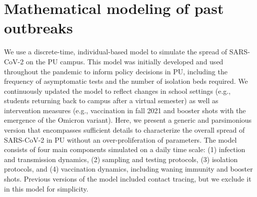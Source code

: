 \documentclass[12pt]{article}
\newcommand{\fref}[1]{Fig.~\ref{fig:#1}}
\providecommand{\DIFdelbegin}{} %
\providecommand{\DIFdelend}{} %
\newcommand{\DIFscaledelfig}{0.5}
\newlength{\DIFdelgraphicswidth} %
\newlength{\DIFdelgraphicsheight} %
\newcommand{\DIFdelincludegraphics}[2][]{%
\sbox{\DIFdelgraphicsbox}{\DIFOincludegraphics[#1]{#2}}%
\settoboxwidth{\DIFdelgraphicswidth}{\DIFdelgraphicsbox} %
\settoboxtotalheight{\DIFdelgraphicsheight}{\DIFdelgraphicsbox} %
\scalebox{\DIFscaledelfig}{%
\parbox[b]{\DIFdelgraphicswidth}{\usebox{\DIFdelgraphicsbox}\\[-\baselineskip] \rule{\DIFdelgraphicswidth}{0em}}\llap{\resizebox{\DIFdelgraphicswidth}{\DIFdelgraphicsheight}{%
\setlength{\unitlength}{\DIFdelgraphicswidth}%
\begin{picture}(1,1)%
\thicklines\linethickness{2pt} %
{\color[rgb]{1,0,0}\put(0,0){\framebox(1,1){}}}%
{\color[rgb]{1,0,0}\put(0,0){\line( 1,1){1}}}%
{\color[rgb]{1,0,0}\put(0,1){\line(1,-1){1}}}%
\end{picture}%
}\hspace*{3pt}}} %
} %
\DeclareRobustCommand{\DIFdelbegin}{\DIFOdelbegin \let\includegraphics\DIFdelincludegraphics} %
\DeclareRobustCommand{\DIFdelend}{\DIFOaddend \let\includegraphics\DIFOincludegraphics} %
\begin{document}
\DIFdelbegin %

\DIFdelend \section*{Mathematical modeling of past outbreaks}

We use a discrete-time, individual-based model to simulate the spread of SARS-CoV-2 on the PU campus.
This model was initially developed and used throughout the pandemic to inform policy decisions in PU, including the frequency of asymptomatic tests and the number of isolation beds required.
We continuously updated the model to reflect changes in school settings (e.g., students returning back to campus after a virtual semester) as well as intervention measures (e.g., vaccination in fall 2021 and booster shots with the emergence of the Omicron variant).
Here, we present a generic and parsimonious version that encompasses sufficient details to characterize the overall spread of SARS-CoV-2 in PU without an over-proliferation of parameters.
The model consists of four main components simulated on a daily time scale: (1) infection and transmission dynamics, (2) sampling and testing protocols, (3) isolation protocols, and (4) vaccination dynamics, including waning immunity and booster shots.
Previous versions of the model included contact tracing, but we exclude it in this model for simplicity.
\end{document}
